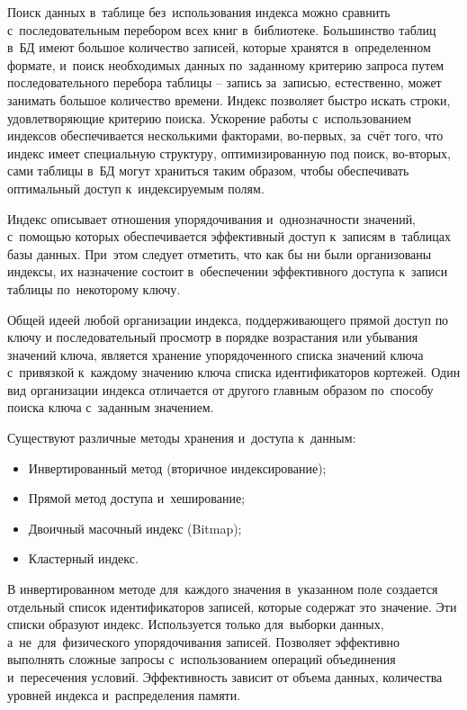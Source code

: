 \documentclass{ou}
\begin{document}
Поиск данных в~таблице без~использования индекса можно сравнить с~последовательным перебором всех книг в~библиотеке. Большинство таблиц в~БД имеют большое количество записей, которые хранятся в~определенном формате, и~поиск необходимых данных по~заданному критерию запроса путем последовательного перебора таблицы -- запись за~записью, естественно, может занимать большое количество времени. Индекс позволяет быстро искать строки, удовлетворяющие критерию поиска. Ускорение работы с~использованием индексов обеспечивается несколькими факторами, во-первых, за~счёт того, что индекс имеет специальную структуру, оптимизированную под поиск, во-вторых, сами таблицы в~БД могут храниться таким образом, чтобы обеспечивать оптимальный доступ к~индексируемым полям.

Индекс описывает отношения упорядочивания и~однозначности значений, с~помощью которых обеспечивается эффективный доступ к~записям в~таблицах базы данных. При~этом следует отметить, что как бы ни были организованы индексы, их назначение состоит в~обеспечении эффективного доступа к~записи таблицы по~некоторому ключу\cite{Senchenko2015}.

Общей идеей любой организации индекса, поддерживающего прямой доступ по ключу и последовательный просмотр в порядке возрастания или убывания значений ключа, является хранение упорядоченного списка значений ключа с~привязкой к~каждому значению ключа списка идентификаторов кортежей. Один вид организации индекса отличается от другого главным образом по~способу поиска ключа с~заданным значением. 

Существуют различные методы хранения и~доступа к~данным:
\begin{itemize}[label=-, leftmargin=0em, itemindent=3.35em, nosep]
\item Инвертированный метод (вторичное индексирование);
\item Прямой метод доступа и~хеширование;
\item Двоичный масочный индекс (Bitmap);
\item Кластерный индекс.
\end{itemize}
В инвертированном методе для~каждого значения в~указанном поле создается отдельный список идентификаторов записей, которые содержат это значение. Эти списки образуют индекс. Используется только для~выборки данных, а~не~для~физического упорядочивания записей. Позволяет эффективно выполнять сложные запросы с~использованием операций объединения и~пересечения условий. Эффективность зависит от объема данных, количества уровней индекса и~распределения памяти\cite{Sergeev2012}.
\end{document}
